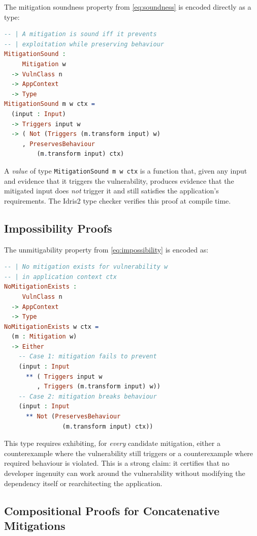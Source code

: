 \documentclass[11pt,twocolumn]{article}
\begin{document}
The mitigation soundness property from \cref{eq:soundness} is
encoded directly as a type:

\begin{lstlisting}[language=Idris,caption={Soundness proof type},label=lst:idris-soundness]
-- | A mitigation is sound iff it prevents
-- | exploitation while preserving behaviour
MitigationSound :
     Mitigation w
  -> VulnClass n
  -> AppContext
  -> Type
MitigationSound m w ctx =
  (input : Input)
  -> Triggers input w
  -> ( Not (Triggers (m.transform input) w)
     , PreservesBehaviour
         (m.transform input) ctx)
\end{lstlisting}

A \emph{value} of type \texttt{MitigationSound m w ctx} is a function
that, given any input and evidence that it triggers the vulnerability,
produces evidence that the mitigated input does \emph{not} trigger it
and still satisfies the application's requirements. The Idris2 type
checker verifies this proof at compile time.

\subsection{Impossibility Proofs}

The unmitigability property from \cref{eq:impossibility} is encoded as:

\begin{lstlisting}[language=Idris,caption={Impossibility proof type},label=lst:idris-impossible]
-- | No mitigation exists for vulnerability w
-- | in application context ctx
NoMitigationExists :
     VulnClass n
  -> AppContext
  -> Type
NoMitigationExists w ctx =
  (m : Mitigation w)
  -> Either
    -- Case 1: mitigation fails to prevent
    (input : Input
      ** ( Triggers input w
         , Triggers (m.transform input) w))
    -- Case 2: mitigation breaks behaviour
    (input : Input
      ** Not (PreservesBehaviour
                (m.transform input) ctx))
\end{lstlisting}

This type requires exhibiting, for \emph{every} candidate mitigation,
either a counterexample where the vulnerability still triggers or a
counterexample where required behaviour is violated. This is a strong
claim: it certifies that no developer ingenuity can work around the
vulnerability without modifying the dependency itself or rearchitecting
the application.

\subsection{Compositional Proofs for Concatenative Mitigations}
\end{document}
